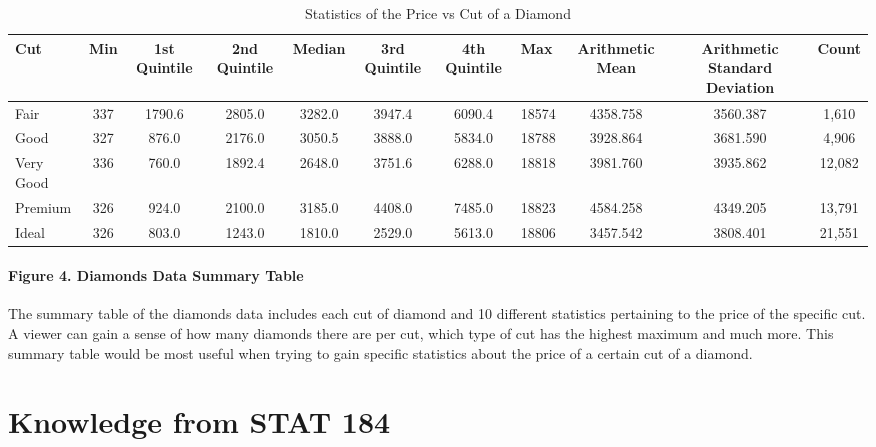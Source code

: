 \documentclass[
]{article}
\begin{document}
\begin{table}

\caption{\label{tab:unnamed-chunk-4}Statistics of the Price vs Cut of a Diamond}
\centering
\fontsize{16}{18}\selectfont
\begin{tabular}[t]{lcccccclccc}
\toprule
Cut & Min & 1st Quintile & 2nd Quintile & Median & 3rd Quintile & 4th Quintile & Max & Arithmetic Mean & Arithmetic Standard Deviation & Count\\
\midrule
Fair & 337 & 1790.6 & 2805.0 & 3282.0 & 3947.4 & 6090.4 & 18574 & 4358.758 & 3560.387 & 1,610\\
Good & 327 & 876.0 & 2176.0 & 3050.5 & 3888.0 & 5834.0 & 18788 & 3928.864 & 3681.590 & 4,906\\
Very Good & 336 & 760.0 & 1892.4 & 2648.0 & 3751.6 & 6288.0 & 18818 & 3981.760 & 3935.862 & 12,082\\
Premium & 326 & 924.0 & 2100.0 & 3185.0 & 4408.0 & 7485.0 & 18823 & 4584.258 & 4349.205 & 13,791\\
Ideal & 326 & 803.0 & 1243.0 & 1810.0 & 2529.0 & 5613.0 & 18806 & 3457.542 & 3808.401 & 21,551\\
\bottomrule
\end{tabular}
\end{table}

\hypertarget{figure-4.-diamonds-data-summary-table}{%
\paragraph{Figure 4. Diamonds Data Summary
Table}\label{figure-4.-diamonds-data-summary-table}}

The summary table of the diamonds data includes each cut of diamond and
10 different statistics pertaining to the price of the specific cut. A
viewer can gain a sense of how many diamonds there are per cut, which
type of cut has the highest maximum and much more. This summary table
would be most useful when trying to gain specific statistics about the
price of a certain cut of a diamond.

\hypertarget{knowledge-from-stat-184}{%
\section{Knowledge from STAT 184}\label{knowledge-from-stat-184}}
\end{document}
